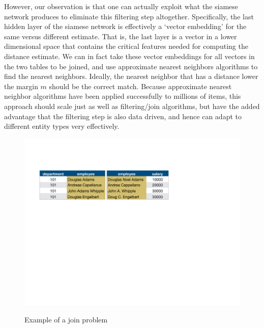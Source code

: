 However, our observation is that one can actually exploit what the siamese network produces to eliminate this filtering step altogether.  Specifically, the last hidden layer of the siamese network is effectively a `vector embedding' for the same versus different estimate.  That is, the last layer is a vector in a lower dimensional space that contains the critical features needed for computing the distance estimate.  We can in fact take these vector embeddings for all vectors in the two tables to be joined, and use approximate nearest neighbors algorithms to find the nearest neighbors.  Ideally, the nearest neighbor that has a distance lower the margin $m$ should be the correct match.  Because approximate nearest neighbor algorithms have been applied successfully to millions of items, this approach should scale just as well as filtering/join algorithms, but have the added advantage that the filtering step is also data driven, and hence can adapt to different entity types very effectively.

\begin{figure}
\centering
\includegraphics[width=1\linewidth]{fig1}
\label{table-example}
\caption{Example of a join problem}
\end{figure}


